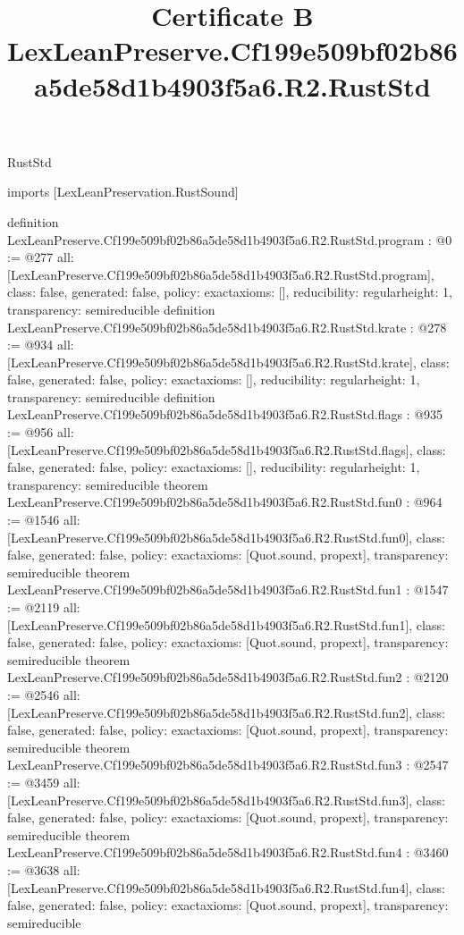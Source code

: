 \begin{lexlean}{RustStd}
\title{Certificate B LexLeanPreserve.Cf199e509bf02b86a5de58d1b4903f5a6.R2.RustStd}
\begin{coremodule}
imports [LexLeanPreservation.RustSound]

definition LexLeanPreserve.Cf199e509bf02b86a5de58d1b4903f5a6.R2.RustStd.program : @0 := @277 {
  all: [LexLeanPreserve.Cf199e509bf02b86a5de58d1b4903f5a6.R2.RustStd.program],
  class: false,
  generated: false,
  policy: exact{axioms: []},
  reducibility: regular{height: 1},
  transparency: semireducible
}
definition LexLeanPreserve.Cf199e509bf02b86a5de58d1b4903f5a6.R2.RustStd.krate : @278 := @934 {
  all: [LexLeanPreserve.Cf199e509bf02b86a5de58d1b4903f5a6.R2.RustStd.krate],
  class: false,
  generated: false,
  policy: exact{axioms: []},
  reducibility: regular{height: 1},
  transparency: semireducible
}
definition LexLeanPreserve.Cf199e509bf02b86a5de58d1b4903f5a6.R2.RustStd.flags : @935 := @956 {
  all: [LexLeanPreserve.Cf199e509bf02b86a5de58d1b4903f5a6.R2.RustStd.flags],
  class: false,
  generated: false,
  policy: exact{axioms: []},
  reducibility: regular{height: 1},
  transparency: semireducible
}
theorem LexLeanPreserve.Cf199e509bf02b86a5de58d1b4903f5a6.R2.RustStd.fun0 : @964 := @1546 {
  all: [LexLeanPreserve.Cf199e509bf02b86a5de58d1b4903f5a6.R2.RustStd.fun0],
  class: false,
  generated: false,
  policy: exact{axioms: [Quot.sound, propext]},
  transparency: semireducible
}
theorem LexLeanPreserve.Cf199e509bf02b86a5de58d1b4903f5a6.R2.RustStd.fun1 : @1547 := @2119 {
  all: [LexLeanPreserve.Cf199e509bf02b86a5de58d1b4903f5a6.R2.RustStd.fun1],
  class: false,
  generated: false,
  policy: exact{axioms: [Quot.sound, propext]},
  transparency: semireducible
}
theorem LexLeanPreserve.Cf199e509bf02b86a5de58d1b4903f5a6.R2.RustStd.fun2 : @2120 := @2546 {
  all: [LexLeanPreserve.Cf199e509bf02b86a5de58d1b4903f5a6.R2.RustStd.fun2],
  class: false,
  generated: false,
  policy: exact{axioms: [Quot.sound, propext]},
  transparency: semireducible
}
theorem LexLeanPreserve.Cf199e509bf02b86a5de58d1b4903f5a6.R2.RustStd.fun3 : @2547 := @3459 {
  all: [LexLeanPreserve.Cf199e509bf02b86a5de58d1b4903f5a6.R2.RustStd.fun3],
  class: false,
  generated: false,
  policy: exact{axioms: [Quot.sound, propext]},
  transparency: semireducible
}
theorem LexLeanPreserve.Cf199e509bf02b86a5de58d1b4903f5a6.R2.RustStd.fun4 : @3460 := @3638 {
  all: [LexLeanPreserve.Cf199e509bf02b86a5de58d1b4903f5a6.R2.RustStd.fun4],
  class: false,
  generated: false,
  policy: exact{axioms: [Quot.sound, propext]},
  transparency: semireducible
}
\end{coremodule}
\end{lexlean}
